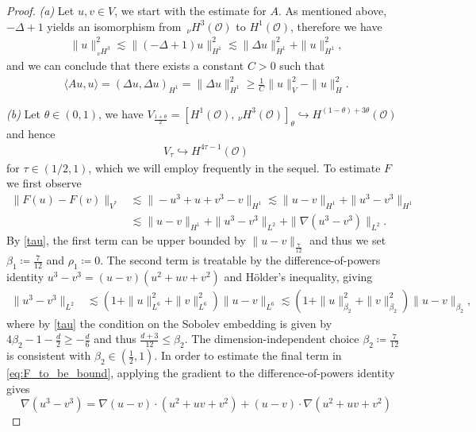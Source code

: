 \documentclass[reqno]{amsart}
\newcommand{\sO}{\mathscr{O}}
\newcommand{\ce}{\coloneqq}
\newcommand{\1}{\mathbf{1}}
\newcommand{\nH}{\ensuremath{\,_\nu H}}
\begin{document}
\begin{proof}
\textit{ (a)} Let $u,v\in V$, we start with the estimate for $A$. As mentioned above, $-\Delta+1$ yields an isomorphism from $\nH^3(\sO)$ to $ H^1(\sO)$, therefore we have
    \begin{align*}
        \|u \|^2_{\nH^3}\lesssim \| (-\Delta+1)u\|^2_{H^1}\lesssim \| \Delta u\|^2_{H^1}+\| u\|^2_{H^1},
    \end{align*}
    and we can conclude that there exists a constant $C > 0$ such that 
    \begin{align*}
       \langle Au,u \rangle=(\Delta u,\Delta u)_{H^1}= \| \Delta u\|^2_{H^1} \geq \frac{1}{C} \|u \|^2_{V}-\|u \|^2_H.
    \end{align*}
    
    \textit{(b)} Let $\theta \in (0,1)$, we have $V_{\frac{1+\theta}{2}}=[H^1(\sO),\nH^3(\sO)]_{\theta}\hookrightarrow H^{(1-\theta)+3\theta}(\sO)$ and hence
\begin{align}\label{tau}
   V_{\tau} \hookrightarrow H^{4\tau-1}(\sO)
\end{align}
for $\tau \in (1/2,1)$, which we will employ frequently in the sequel. To estimate $F$ we first observe
\begin{align}
    \|F(u)-F(v) \|_{V^\ast}   &\lesssim \|-u^3+u+v^3-v\|_{H^1} 
 \lesssim \| u-v \|_{H^1} +\|u^3-v^3 \|_{H^1} \nonumber\\ 
  &\lesssim \| u-v \|_{H^1} + \| u^3-v^3 \|_{L^2}+  \|\nabla ( u^3-v^3 )\|_{L^2}.\label{eq:F_to_be_bound}
\end{align}    
By \eqref{tau}, the first term can be upper bounded by $\| u-v \|_{\frac{7}{12}}$ and thus we set $\beta_1 \ce \frac{7}{12}$ and $\rho_1 \ce 0$. The second term is treatable by the difference-of-powers identity $u^3-v^3=(u-v)(u^2+uv+v^2)$ and Hölder's inequality, giving
\begin{align*}
    \|u^3-v^3 \|_{L^2}& \lesssim (1+\|u \|^2_{L^6}+\|v \|^2_{L^6} ) \|u-v \|_{L^6}
    \lesssim (1+\|u \|^2_{\beta_2}+\|v \|^2_{\beta_2} ) \|u-v \|_{\beta_2},
\end{align*}
where by \eqref{tau} the condition on the Sobolev embedding is given by $4\beta_2-1-\frac{d}{2} \geq -\frac{d}{6}$ and thus $\frac{d+3}{12} \leq \beta_2$. The dimension-independent choice $\beta_2 \ce \frac{7}{12}$ is consistent with $\beta_2 \in (\frac{1}{2}, 1)$.
In order to estimate the final term in \eqref{eq:F_to_be_bound}, applying the gradient to the difference-of-powers identity gives
\[ \nabla (u^3-v^3)=\nabla (u-v) \cdot (u^2+uv+v^2)+ (u-v)\cdot \nabla (u^2+uv+v^2)\]

\end{proof}
\end{document}
